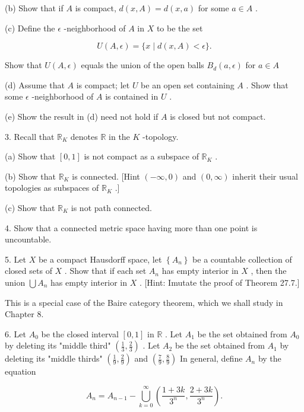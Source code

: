 \documentclass[10pt]{article}
\begin{document}
(b) Show that if \(A\) is compact, \(d\left( {x,A}\right)  = d\left( {x,a}\right)\) for some \(a \in  A\) .

(c) Define the \(\epsilon\) -neighborhood of \(A\) in \(X\) to be the set

\[
U\left( {A,\epsilon }\right)  = \{ x \mid  d\left( {x,A}\right)  < \epsilon \} .
\]

Show that \(U\left( {A,\epsilon }\right)\) equals the union of the open balls \({B}_{d}\left( {a,\epsilon }\right)\) for \(a \in  A\)

(d) Assume that \(A\) is compact; let \(U\) be an open set containing \(A\) . Show that some \(\epsilon\) -neighborhood of \(A\) is contained in \(U\) .

(e) Show the result in (d) need not hold if \(A\) is closed but not compact.

3. Recall that \({\mathbb{R}}_{K}\) denotes \(\mathbb{R}\) in the \(K\) -topology.

(a) Show that \(\left\lbrack  {0,1}\right\rbrack\) is not compact as a subspace of \({\mathbb{R}}_{K}\) .

(b) Show that \({\mathbb{R}}_{K}\) is connected. [Hint \(\left( {-\infty ,0}\right)\) and \(\left( {0,\infty }\right)\) inherit their usual topologies as subspaces of \({\mathbb{R}}_{K}\) .]

(c) Show that \({\mathbb{R}}_{K}\) is not path connected.

4. Show that a connected metric space having more than one point is uncountable.

5. Let \(X\) be a compact Hausdorff space, let \(\left\{  {A}_{n}\right\}\) be a countable collection of closed sets of \(X\) . Show that if each set \({A}_{n}\) has empty interior in \(X\) , then the union \(\bigcup {A}_{n}\) has empty interior in \(X\) . [Hint: Imutate the proof of Theorem 27.7.]

This is a special case of the Baire category theorem, which we shall study in Chapter 8.

6. Let \({A}_{0}\) be the closed interval \(\left\lbrack  {0,1}\right\rbrack\) in \(\mathbb{R}\) . Let \({A}_{1}\) be the set obtained from \({A}_{0}\) by deleting its "middle third" \(\left( {\frac{1}{3},\frac{2}{3}}\right)\) . Let \({A}_{2}\) be the set obtained from \({A}_{1}\) by deleting its "middle thirds" \(\left( {\frac{1}{9},\frac{2}{9}}\right)\) and \(\left( {\frac{7}{9},\frac{8}{9}}\right)\) In general, define \({A}_{n}\) by the equation

\[
{A}_{n} = {A}_{n - 1} - \mathop{\bigcup }\limits_{{k = 0}}^{\infty }\left( {\frac{1 + {3k}}{{3}^{n}},\frac{2 + {3k}}{{3}^{n}}}\right) .
\]
\end{document}
